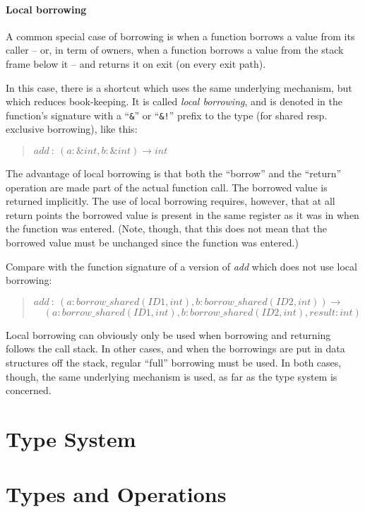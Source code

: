 \documentclass[a4paper]{book}
\newcommand\FuncSignature[2]{\begin{quote}$\mathit{#1}\ :\ \mathit{#2}$\end{quote}}
\newcommand\FuncSignatureII[3]{\begin{quote}$\mathit{#1}\ :\ \mathit{#2} \to$\\${}\quad \mathit{#3}$ \end{quote}}
\begin{document}
\subsection{Local borrowing} %
\label{sec:design-local-borrowing}
A common special case of borrowing is when a function borrows a value
from its caller -- or, in term of owners, when a function borrows a value from
the stack frame below it -- and returns it on exit (on every exit path).

In this case, there is a shortcut which uses the same underlying mechanism,
but which reduces book-keeping.
It is called \emph{local borrowing}, and
is denoted in the function's signature with a ``\texttt{\&}'' or
``\texttt{\&!}'' prefix to the type (for shared resp. exclusive
borrowing), like this:
\FuncSignature{add}{(a:\&int, b:\&int) \to int}

The advantage of local borrowing is that both the ``borrow'' and the
``return'' operation are made part of the actual function call.
The borrowed value is returned implicitly. The use of local borrowing requires,
however, that at all return points the borrowed value is present in the
same register as it was in when the function was entered.
(Note, though, that this does not mean that the borrowed value must be
unchanged since the function was entered.)

Compare with the function signature of a version of \emph{add} which does
not use local borrowing:

\FuncSignatureII{add}
{(a:borrow\_shared(ID1,int), b:borrow\_shared(ID2,int))}
{(a:borrow\_shared(ID1,int), b:borrow\_shared(ID2,int), result:int)}

Local borrowing can obviously only be used when borrowing and returning
follows the call stack. In other cases, and when the borrowings are
put in data structures off the stack, regular ``full'' borrowing must be used.
In both cases, though, the same underlying mechanism is used, as far
as the type system is concerned.

\part{Type System}


\part{Types and Operations}
\end{document}
